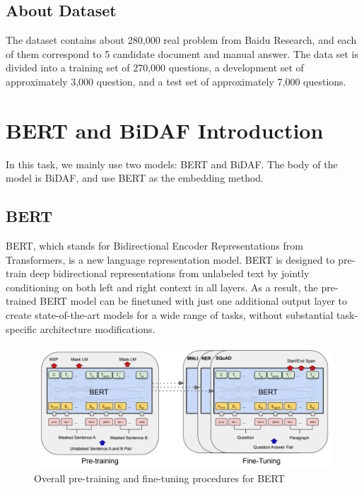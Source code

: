 \documentclass{article}
\begin{document}
\subsection{About Dataset}
The dataset contains about 280,000 real problem from Baidu Research, and each of them correspond to 5 candidate document and manual answer. The data set is divided into a training set of 270,000 questions, a development set of approximately 3,000 question, and a test set of approximately 7,000 questions.

\section{BERT and BiDAF Introduction}
In this task, we mainly use two models: BERT and BiDAF. The body of the model is BiDAF, and use BERT as the embedding method.
\subsection{BERT}
BERT, which stands for Bidirectional Encoder Representations from Transformers, is a new language representation model. BERT is designed to pre-train deep bidirectional representations from unlabeled text by jointly conditioning on both left and right context in all layers. As a result, the pre-trained BERT model can be finetuned with just one additional output layer to create state-of-the-art models for a wide range of tasks, without substantial task-specific architecture modifications.\citet{DBLP:journals/corr/abs-1810-04805}
\begin{figure}[h]
	\centering
	\includegraphics[scale=0.4]{bert.png}
	\caption{Overall pre-training and fine-tuning procedures for BERT}
\end{figure}
\end{document}

